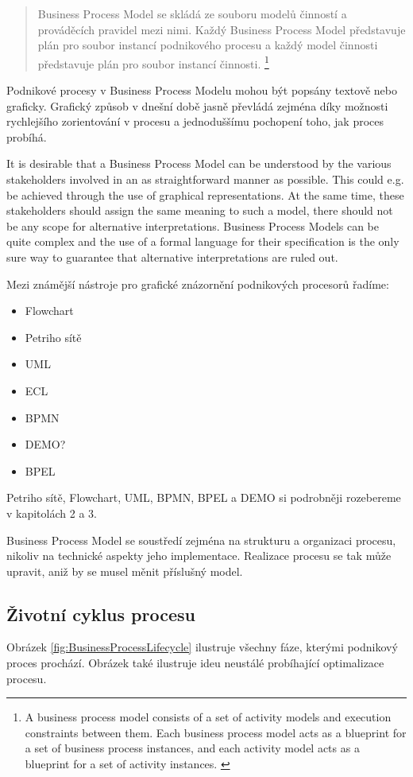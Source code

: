 \documentclass[]{article}
\begin{document}
\begin{quote}
Business Process Model se skládá ze souboru modelů činností a prováděcích pravidel mezi nimi. Každý Business Process Model představuje plán pro soubor instancí podnikového procesu a každý model činnosti představuje plán pro soubor instancí činnosti.
\footnote{A business process model consists of a set of activity models and execution constraints between them. Each business process model acts as a blueprint for a set of business process instances, and each activity model acts as a blueprint for a set of activity instances. \cite{Weske2007}}
\end{quote}

Podnikové procesy v Business Process Modelu mohou být popsány textově nebo graficky. Grafický způsob v dnešní době jasně převládá zejména díky možnosti rychlejšího zorientování v procesu a jednoduššímu pochopení toho, jak proces probíhá.

It is desirable that a Business Process Model can be understood by the various stakeholders involved in an as straightforward manner as possible. This could e.g. be achieved through the use of graphical representations. At the same time, these stakeholders should assign the same meaning to such a model, there should not be any scope for alternative interpretations. Business Process Models can be quite complex and the use of a formal language for their specification is the only sure way to guarantee that alternative interpretations are ruled out. 

Mezi známější nástroje pro grafické znázornění podnikových procesorů řadíme: \cite{Naplava2015}
\begin{itemize}
\item Flowchart
\item Petriho sítě
\item UML
\item ECL
\item BPMN
\item DEMO?
\item BPEL
\end{itemize}

Petriho sítě, Flowchart, UML, BPMN, BPEL a DEMO si podrobněji rozebereme v kapitolách 2 a 3. %

Business Process Model se soustředí zejména na strukturu a organizaci procesu, nikoliv na technické aspekty jeho implementace. Realizace procesu se tak může upravit, aniž by se musel měnit příslušný model.

\subsection{Životní cyklus procesu}
Obrázek \ref{fig:BusinessProcessLifecycle} ilustruje všechny fáze, kterými podnikový proces prochází. Obrázek také ilustruje ideu neustálé probíhající optimalizace procesu.
\end{document}
